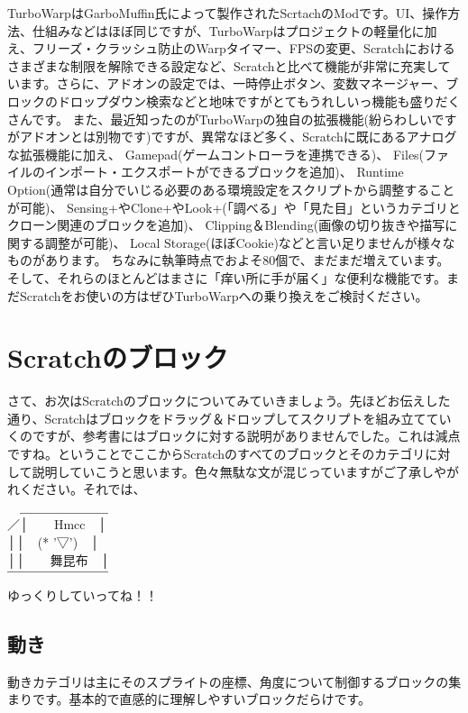 \documentclass[b5paper,10pt]{jsarticle}
\begin{document}
\begin{multicols*}{3}
TurboWarpはGarboMuffin氏によって製作されたScrtachのModです。UI、操作方法、仕組みなどはほぼ同じですが、TurboWarpはプロジェクトの軽量化に加え、フリーズ・クラッシュ防止のWarpタイマー、FPSの変更、Scratchにおけるさまざまな制限を解除できる設定など、Scratchと比べて機能が非常に充実しています。さらに、アドオンの設定では、一時停止ボタン、変数マネージャー、ブロックのドロップダウン検索などと地味ですがとてもうれしいっ機能も盛りだくさんです。
また、最近知ったのがTurboWarpの独自の拡張機能(紛らわしいですがアドオンとは別物です)ですが、異常なほど多く、Scratchに既にあるアナログな拡張機能に加え、
Gamepad(ゲームコントローラを連携できる)、
Files(ファイルのインポート・エクスポートができるブロックを追加)、
Runtime Option(通常は自分でいじる必要のある環境設定をスクリプトから調整することが可能)、
Sensing+やClone+やLook+(「調べる」や「見た目」というカテゴリとクローン関連のブロックを追加)、
Clipping＆Blending(画像の切り抜きや描写に関する調整が可能)、
Local Storage(ほぼCookie)などと言い足りませんが様々なものがあります。
ちなみに執筆時点でおよそ80個で、まだまだ増えています。
そして、それらのほとんどはまさに「痒い所に手が届く」な便利な機能です。まだScratchをお使いの方はぜひTurboWarpへの乗り換えをご検討ください。

\section{Scratchのブロック}

さて、お次はScratchのブロックについてみていきましょう。先ほどお伝えした通り、Scratchはブロックをドラッグ＆ドロップしてスクリプトを組み立てていくのですが、参考書にはブロックに対する説明がありませんでした。これは減点ですね。ということでここからScratchのすべてのブロックとそのカテゴリに対して説明していこうと思います。色々無駄な文が混じっていますがご了承しやがれください。それでは、\\
　＿＿＿＿＿＿＿\\
／│　　Hmcc　│\\
││　(* '▽')　│\\
││　　舞昆布　│\\
￣￣￣￣￣￣￣￣\\
ゆっくりしていってね！！
\pagebreak
\subsection{動き}
動きカテゴリは主にそのスプライトの座標、角度について制御するブロックの集まりです。基本的で直感的に理解しやすいブロックだらけです。


\end{multicols*}
\end{document}
